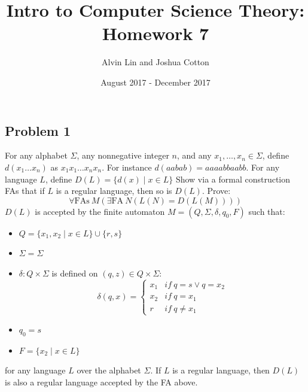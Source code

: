 \documentclass{math}
\title{Intro to Computer Science Theory: Homework 7}
\author{Alvin Lin and Joshua Cotton}
\date{August 2017 - December 2017}
\begin{document}
\maketitle

\subsection*{Problem 1}
For any alphabet \( \Sigma \), any nonnegative integer \( n \), and any
\( x_1,\dots,x_n\in\Sigma \), define \( d(x_1\dots x_n) \) as
\( x_1x_1\dots x_nx_n \). For instance \( d(aabab) = aaaabbaabb \). For
any language \( L \), define \( D(L) = \{d(x)\mid x\in L\} \) Show via
a formal construction FAs that if \( L \) is a regular language, then so
is \( D(L) \). Prove:
\[ \forall\text{FAs}~M(\exists\text{FA}~N(L(N) = D(L(M)))) \]
\( D(L) \) is accepted by the finite automaton \( M = (Q,\Sigma,\delta,q_0,F)
\) such that:
\begin{itemize}
  \item \( Q = \{x_1,x_2\mid x\in L\}\cup\{r,s\} \)
  \item \( \Sigma = \Sigma \)
  \item \( \delta:Q\times\Sigma \) is defined on \( (q,z)\in Q\times\Sigma \):
  \[ \delta(q,x) = \begin{cases}
    x_1 & if~q = s\vee q = x_2 \\
    x_2 & if~q = x_1 \\
    r & if~q \ne x_1
  \end{cases} \]
  \item \( q_0 = s \)
  \item \( F = \{x_2\mid x\in L\} \)
\end{itemize}
for any language \( L \) over the alphabet \( \Sigma \). If \( L \) is a regular
language, then \( D(L) \) is also a regular language accepted by the FA above.
\end{document}

